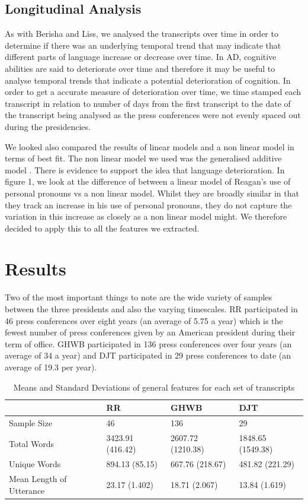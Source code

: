 \documentclass[12pt]{article}
\begin{document}
\subsection{Longitudinal Analysis}
As with Berisha and Liss\cite{Berisha2015}, we analysed the transcripts over time in order to determine if there was an underlying temporal trend that may indicate that different parts of language increase or decrease over time. In AD, cognitive abilities are said to deteriorate over time and therefore it may be useful to analyse temporal trends that indicate a potential deterioration of cognition. In order to get a accurate measure of deterioration over time, we time stamped each transcript in relation to number of days from the first transcript to the date of the transcript being analysed as the press conferences were not evenly spaced out during the presidencies.
\par
We looked also compared the results of linear models and a non linear model in terms of best fit. The non linear model we used was the generalised additive model \cite{Hastie1986}.
There is evidence to support the idea that language deterioration. In figure 1, we look at the difference of between a linear model of Reagan's use of personal pronouns vs a non linear model. Whilst they are broadly similar in that they track an increase in his use of personal pronouns, they do not capture the variation in this increase as closely as a non linear model might. We therefore decided to apply this to all the features we extracted.

\section{Results}\label{results}
Two of the most important things to note are the wide variety of samples between the three presidents and also the varying timescales. RR participated in 46 press conferences over eight years (an average of 5.75 a year) which is the fewest number of press conferences given by an American president during their term of office. GHWB participated in 136 press conferences over four years (an average of 34 a year) and DJT participated in 29 press conferences to date (an average of 19.3 per year). 

\begin{table}[H]
	\begin{center}
	\begin{tabular}{ | p{3cm} | p{1.5cm} | p{1.5cm} | p{1.5cm} |}
		\hline
		& RR & GHWB & DJT \\ \hline
		Sample Size & 46 & 136 & 29 \\ \hline
		Total Words & 3423.91 (416.42) & 2607.72 (1210.38) & 1848.65 (1549.38) \\ \hline
		Unique Words & 894.13 (85.15) & 667.76 (218.67) & 481.82 (221.29) \\ \hline
		Mean Length of Utterance & 23.17 (1.402) & 18.71 (2.067) & 13.84 (1.619) \\ \hline
	\end{tabular}
	\caption{\label{tab:table-name}Means and Standard Deviations of general features for each set of transcripts}
	\end{center} 
\end{table}
\end{document}
